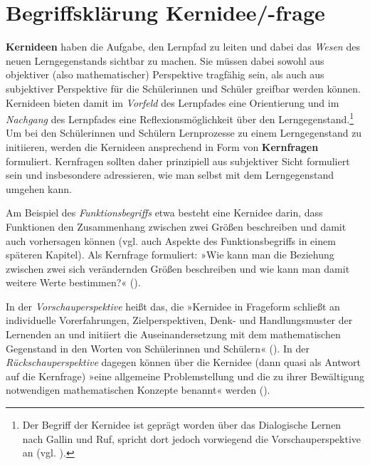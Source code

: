 \documentclass[
]{scrbook}
\theoremstyle{definition}
\theoremstyle{definition}
\theoremstyle{definition}
\theoremstyle{definition}
\theoremstyle{remark}
\begin{document}
\section{Begriffsklärung Kernidee/-frage}\label{kernidee-begriffsklaerung}

\textbf{Kernideen} haben die Aufgabe, den Lernpfad zu leiten und dabei das \emph{Wesen} des neuen Lerngegenstands sichtbar zu machen. Sie müssen dabei sowohl aus objektiver (also mathematischer) Perspektive tragfähig sein, als auch aus subjektiver Perspektive für die Schülerinnen und Schüler greifbar werden können. Kernideen bieten damit im \emph{Vorfeld} des Lernpfades eine Orientierung und im \emph{Nachgang} des Lernpfades eine Reflexionsmöglichkeit über den Lerngegenstand.\footnote{Der Begriff der Kernidee ist geprägt worden über das Dialogische Lernen nach Gallin und Ruf, spricht dort jedoch vorwiegend die Vorschauperspektive an (vgl. ).} Um bei den Schülerinnen und Schülern Lernprozesse zu einem Lerngegenstand zu initiieren, werden die Kernideen ansprechend in Form von \textbf{Kernfragen} formuliert. Kernfragen sollten daher prinzipiell aus subjektiver Sicht formuliert sein und insbesondere adressieren, wie man selbst mit dem Lerngegenstand umgehen kann.

Am Beispiel des \emph{Funktionsbegriffs} etwa besteht eine Kernidee darin, dass Funktionen den Zusammenhang zwischen zwei Größen beschreiben und damit auch vorhersagen können (vgl. auch Aspekte des Funktionsbegriffs in einem späteren Kapitel). Als Kernfrage formuliert: »Wie kann man die Beziehung zwischen zwei sich verändernden Größen beschreiben und wie kann man damit weitere Werte bestimmen?« ().

In der \emph{Vorschauperspektive} heißt das, die »Kernidee in Frageform schließt an individuelle Vorerfahrungen, Zielperspektiven, Denk- und Handlungsmuster der Lernenden an und initiiert die Auseinandersetzung mit dem mathematischen Gegenstand in den Worten von Schülerinnen und Schülern« (). In der \emph{Rückschauperspektive} dagegen können über die Kernidee (dann quasi als Antwort auf die Kernfrage) »eine allgemeine Problemstellung und die zu ihrer Bewältigung notwendigen mathematischen Konzepte benannt« werden ().
\end{document}
